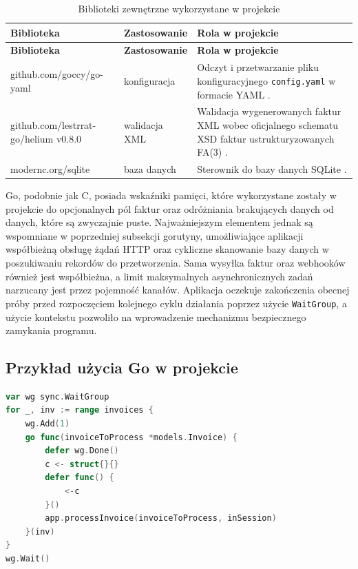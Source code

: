 \begin{small}
\begin{longtable}{>{\raggedright\arraybackslash}p{4.5cm} >{\raggedright\arraybackslash}p{3cm} >{\raggedright\arraybackslash}p{6cm}}
\caption{Biblioteki zewnętrzne wykorzystane w projekcie}
\label{tab:external_libraries} \\
\toprule
\textbf{Biblioteka} & \textbf{Zastosowanie} & \textbf{Rola w projekcie} \\
\midrule
\endfirsthead

\toprule
\textbf{Biblioteka} & \textbf{Zastosowanie} & \textbf{Rola w projekcie} \\
\midrule
\endhead

\bottomrule
\endfoot

github.com/goccy/go-yaml & konfiguracja & Odczyt i przetwarzanie pliku konfiguracyjnego \texttt{config.yaml} w formacie YAML \parencite{yaml_package}. \\
github.com/lestrrat-go/helium v0.8.0 & walidacja XML & Walidacja wygenerowanych faktur XML wobec oficjalnego schematu XSD faktur ustrukturyzowanych FA(3) \parencite{helium_package}. \\
modernc.org/sqlite & baza danych & Sterownik do bazy danych SQLite \parencite{sqlite_package}. \\
\end{longtable}
\end{small}

Go, podobnie jak C, posiada wskaźniki pamięci, które wykorzystane zostały w projekcie do opcjonalnych pól faktur oraz odróżniania brakujących danych od danych, które są zwyczajnie puste. Najważniejszym elementem jednak są wspomniane w poprzedniej subsekcji gorutyny, umożliwiające aplikacji współbieżną obsługę żądań HTTP oraz cykliczne skanowanie bazy danych w poszukiwaniu rekordów do przetworzenia. Sama wysyłka faktur oraz webhooków \parencite{redhat_webhooks} również jest współbieżna, a limit maksymalnych asynchronicznych zadań narzucany jest przez pojemność kanałów. Aplikacja oczekuje zakończenia obecnej próby przed rozpoczęciem kolejnego cyklu działania poprzez użycie \texttt{WaitGroup}, a użycie kontekstu pozwoliło na wprowadzenie mechanizmu bezpiecznego zamykania programu.

\subsection{Przykład użycia Go w projekcie}
\begin{lstlisting}[style=thesiscode, language=Go, caption={Przykład współbieżnego przetwarzania faktur}, label={lst:go-concurrency}]
var wg sync.WaitGroup
for _, inv := range invoices {
	wg.Add(1)
	go func(invoiceToProcess *models.Invoice) {
		defer wg.Done()
		c <- struct{}{}
		defer func() {
			<-c
		}()
		app.processInvoice(invoiceToProcess, inSession)
	}(inv)
}
wg.Wait()
\end{lstlisting}

